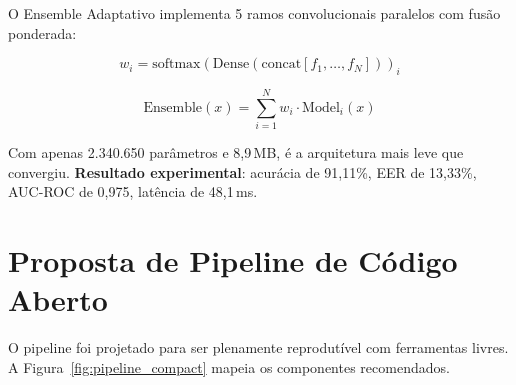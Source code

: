 \documentclass[12pt,a4paper]{article}
\begin{document}
O Ensemble Adaptativo implementa 5 ramos convolucionais paralelos com
fus\~{a}o ponderada:

\begin{equation}
w_i = \mathrm{softmax}\!\left(\text{Dense}\!\left(
\mathrm{concat}[f_1,\ldots,f_N]\right)\right)_i
\end{equation}

\begin{equation}
\text{Ensemble}(x) = \sum_{i=1}^{N}w_i\cdot\text{Model}_i(x)
\end{equation}

Com apenas 2.340.650 par\^{a}metros e 8,9\,MB, \'{e} a arquitetura mais
leve que convergiu.
\textbf{Resultado experimental}: acur\'{a}cia de 91,11\%, EER de 13,33\%,
AUC-ROC de 0,975, lat\^{e}ncia de 48,1\,ms.

\section{Proposta de Pipeline de C\'{o}digo Aberto}
\label{sec:pipeline_opensource}

O pipeline foi projetado para ser plenamente reprodut\'{i}vel com ferramentas
livres.
A Figura~\ref{fig:pipeline_compact} mapeia os componentes recomendados.
\end{document}
